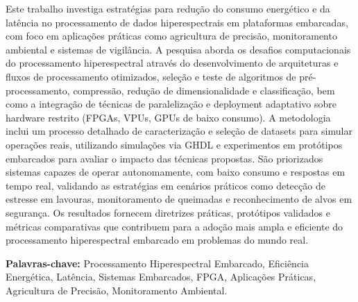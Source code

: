 \documentclass[Portugues,Final]{tese-FT}
\begin{document}
\begin{resumo}
Este trabalho investiga estratégias para redução do consumo energético e da latência no processamento de dados hiperespectrais em plataformas embarcadas, com foco em aplicações práticas como agricultura de precisão, monitoramento ambiental e sistemas de vigilância. A pesquisa aborda os desafios computacionais do processamento hiperespectral através do desenvolvimento de arquiteturas e fluxos de processamento otimizados, seleção e teste de algoritmos de pré-processamento, compressão, redução de dimensionalidade e classificação, bem como a integração de técnicas de paralelização e deployment adaptativo sobre hardware restrito (FPGAs, VPUs, GPUs de baixo consumo). A metodologia inclui um processo detalhado de caracterização e seleção de datasets para simular operações reais, utilizando simulações via GHDL e experimentos em protótipos embarcados para avaliar o impacto das técnicas propostas. São priorizados sistemas capazes de operar autonomamente, com baixo consumo e respostas em tempo real, validando as estratégias em cenários práticos como detecção de estresse em lavouras, monitoramento de queimadas e reconhecimento de alvos em segurança. Os resultados fornecem diretrizes práticas, protótipos validados e métricas comparativas que contribuem para a adoção mais ampla e eficiente do processamento hiperespectral embarcado em problemas do mundo real.

\textbf{Palavras-chave:} Processamento Hiperespectral Embarcado, Eficiência Energética, Latência, Sistemas Embarcados, FPGA, Aplicações Práticas, Agricultura de Precisão, Monitoramento Ambiental.
\end{resumo}
\end{document}
